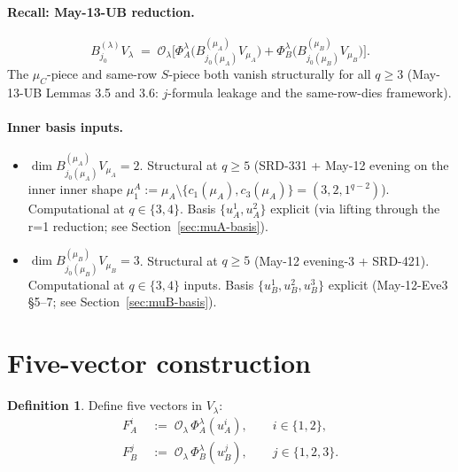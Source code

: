 \documentclass[11pt]{article}
\theoremstyle{definition}
\newtheorem{definition}[theorem]{Definition}
\begin{document}
\paragraph{Recall: May-13-UB reduction.}
\begin{equation}\label{eq:UB-reduction}
   B^{(\lambda)}_{j_0} V_\lambda
   \;=\;
   \mathcal{O}_\lambda \Big[
      \Phi_A^\lambda\big(B^{(\mu_A)}_{j_0(\mu_A)} V_{\mu_A}\big)
      +
      \Phi_B^\lambda\big(B^{(\mu_B)}_{j_0(\mu_B)} V_{\mu_B}\big)
   \Big].
\end{equation}
The $\mu_C$-piece and same-row $S$-piece both vanish structurally for
all $q \ge 3$ (May-13-UB Lemmas 3.5 and 3.6: $j$-formula leakage
and the same-row-dies framework).

\paragraph{Inner basis inputs.}
\begin{itemize}[leftmargin=2em,topsep=0.2em,itemsep=0.1em]
\item $\dim B^{(\mu_A)}_{j_0(\mu_A)} V_{\mu_A} = 2$. Structural at
$q \ge 5$ (SRD-331 + May-12 evening on the inner inner shape
$\mu_1^A := \mu_A \setminus \{c_1(\mu_A), c_3(\mu_A)\}
= (3, 2, 1^{q-2})$). Computational at $q \in \{3, 4\}$. Basis
$\{u_A^1, u_A^2\}$ explicit (via lifting through the r=1 reduction;
see Section~\ref{sec:muA-basis}).
\item $\dim B^{(\mu_B)}_{j_0(\mu_B)} V_{\mu_B} = 3$. Structural at
$q \ge 5$ (May-12 evening-3 + SRD-421). Computational at
$q \in \{3, 4\}$ inputs. Basis $\{u_B^1, u_B^2, u_B^3\}$ explicit
(May-12-Eve3 \S5--7; see Section~\ref{sec:muB-basis}).
\end{itemize}

\section{Five-vector construction}\label{sec:five-vec}

\begin{definition}\label{def:five-vec}
Define five vectors in $V_\lambda$:
\begin{align*}
   F_A^i \;&:=\; \mathcal{O}_\lambda\, \Phi_A^\lambda(u_A^i),
   \qquad i \in \{1, 2\}, \\
   F_B^j \;&:=\; \mathcal{O}_\lambda\, \Phi_B^\lambda(u_B^j),
   \qquad j \in \{1, 2, 3\}.
\end{align*}
\end{definition}
\end{document}
